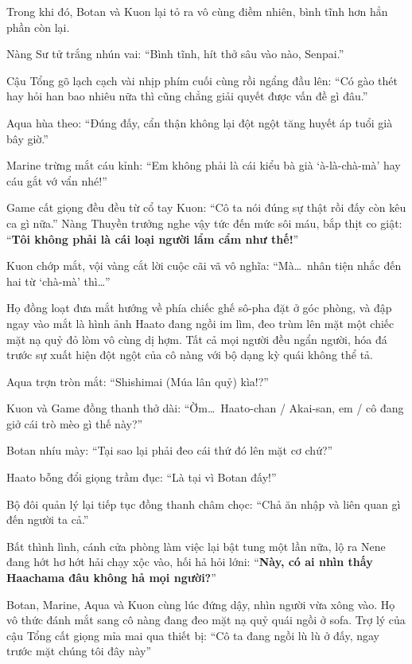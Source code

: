 \documentclass[../main.tex]{subfiles}
\begin{document}
Trong khi đó, Botan và Kuon lại tỏ ra vô cùng điềm nhiên, bình tĩnh hơn hẳn phần còn lại.

Nàng Sư tử trắng nhún vai: ``Bình tĩnh, hít thở sâu vào nào, Senpai.''

Cậu Tổng gõ lạch cạch vài nhịp phím cuối cùng rồi ngẩng đầu lên: ``Có gào thét hay hỏi han bao nhiêu nữa thì cũng chẳng giải quyết được vấn đề gì đâu.''

Aqua hùa theo: ``Đúng đấy, cẩn thận không lại đột ngột tăng huyết áp tuổi già bây giờ.''

Marine trừng mắt cáu kỉnh: ``Em không phải là cái kiểu bà già `à-là-chà-mà' hay cáu gắt vớ vẩn nhé!''

Game cất giọng đều đều từ cổ tay Kuon: ``Cô ta nói đúng sự thật rồi đấy còn kêu ca gì nữa.'' Nàng Thuyền trưởng nghe vậy tức đến mức sôi máu, bắp thịt co giật: ``\textbf{Tôi không phải là cái loại người lẩm cẩm như thế!}''

Kuon chớp mắt, vội vàng cắt lời cuộc cãi vã vô nghĩa: ``Mà\dots\ nhân tiện nhắc đến hai từ `chà-mà' thì\dots''

Họ đồng loạt đưa mắt hướng về phía chiếc ghế sô-pha đặt ở góc phòng, và đập ngay vào mắt là hình ảnh Haato đang ngồi im lìm, đeo trùm lên mặt một chiếc mặt nạ quỷ đỏ lòm vô cùng dị hợm. Tất cả mọi người đều ngẩn người, hóa đá trước sự xuất hiện đột ngột của cô nàng với bộ dạng kỳ quái không thể tả.


Aqua trợn tròn mắt: ``Shishimai (Múa lân quỷ) kìa!?''

Kuon và Game đồng thanh thở dài: ``Ờm\dots\ Haato-chan / Akai-san, em / cô đang giở cái trò mèo gì thế này?''

Botan nhíu mày: ``Tại sao lại phải đeo cái thứ đó lên mặt cơ chứ?''

Haato bỗng đổi giọng trầm đục: ``Là tại vì Botan đấy!''

Bộ đôi quản lý lại tiếp tục đồng thanh châm chọc: ``Chả ăn nhập và liên quan gì đến người ta cả.''

Bất thình lình, cánh cửa phòng làm việc lại bật tung một lần nữa, lộ ra Nene đang hớt hơ hớt hải chạy xộc vào, hối hả hỏi lớni: ``\textbf{Này, có ai nhìn thấy Haachama đâu không hả mọi người?}''


Botan, Marine, Aqua và Kuon cùng lúc đứng dậy, nhìn người vừa xông vào. Họ vô thức đánh mắt sang cô nàng đang đeo mặt nạ quỷ quái ngồi ở sofa. Trợ lý của cậu Tổng cất giọng mỉa mai qua thiết bị: ``Cô ta đang ngồi lù lù ở đấy, ngay trước mặt chúng tôi đây này''
\end{document}
